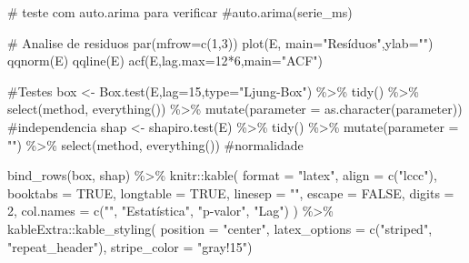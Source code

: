 \documentclass[
  letterpaper,
  DIV=11,
  numbers=noendperiod]{scrartcl}
\newenvironment{Shaded}{\begin{snugshade}}{\end{snugshade}}
\newcommand{\AttributeTok}[1]{\textcolor[rgb]{0.40,0.45,0.13}{#1}}
\newcommand{\CommentTok}[1]{\textcolor[rgb]{0.37,0.37,0.37}{#1}}
\newcommand{\ConstantTok}[1]{\textcolor[rgb]{0.56,0.35,0.01}{#1}}
\newcommand{\DecValTok}[1]{\textcolor[rgb]{0.68,0.00,0.00}{#1}}
\newcommand{\FunctionTok}[1]{\textcolor[rgb]{0.28,0.35,0.67}{#1}}
\newcommand{\NormalTok}[1]{\textcolor[rgb]{0.00,0.23,0.31}{#1}}
\newcommand{\OtherTok}[1]{\textcolor[rgb]{0.00,0.23,0.31}{#1}}
\newcommand{\SpecialCharTok}[1]{\textcolor[rgb]{0.37,0.37,0.37}{#1}}
\newcommand{\StringTok}[1]{\textcolor[rgb]{0.13,0.47,0.30}{#1}}
\begin{document}
\begin{Shaded}
\begin{Highlighting}[]
\CommentTok{\# teste com auto.arima para verificar}
\CommentTok{\#auto.arima(serie\_ms)}


\CommentTok{\# Analise de residuos}
\FunctionTok{par}\NormalTok{(}\AttributeTok{mfrow=}\FunctionTok{c}\NormalTok{(}\DecValTok{1}\NormalTok{,}\DecValTok{3}\NormalTok{))}
\FunctionTok{plot}\NormalTok{(E, }\AttributeTok{main=}\StringTok{"Resíduos"}\NormalTok{,}\AttributeTok{ylab=}\StringTok{""}\NormalTok{)}
\FunctionTok{qqnorm}\NormalTok{(E)}
\FunctionTok{qqline}\NormalTok{(E)}
\FunctionTok{acf}\NormalTok{(E,}\AttributeTok{lag.max=}\DecValTok{12}\SpecialCharTok{*}\DecValTok{6}\NormalTok{,}\AttributeTok{main=}\StringTok{"ACF"}\NormalTok{)}


\CommentTok{\#Testes}
\NormalTok{box }\OtherTok{\textless{}{-}} \FunctionTok{Box.test}\NormalTok{(E,}\AttributeTok{lag=}\DecValTok{15}\NormalTok{,}\AttributeTok{type=}\StringTok{"Ljung{-}Box"}\NormalTok{) }\SpecialCharTok{\%\textgreater{}\%} \FunctionTok{tidy}\NormalTok{() }\SpecialCharTok{\%\textgreater{}\%} \FunctionTok{select}\NormalTok{(method, }\FunctionTok{everything}\NormalTok{()) }\SpecialCharTok{\%\textgreater{}\%} \FunctionTok{mutate}\NormalTok{(}\AttributeTok{parameter =} \FunctionTok{as.character}\NormalTok{(parameter)) }\CommentTok{\#independencia}
\NormalTok{shap }\OtherTok{\textless{}{-}} \FunctionTok{shapiro.test}\NormalTok{(E) }\SpecialCharTok{\%\textgreater{}\%} \FunctionTok{tidy}\NormalTok{() }\SpecialCharTok{\%\textgreater{}\%} \FunctionTok{mutate}\NormalTok{(}\AttributeTok{parameter =} \StringTok{""}\NormalTok{) }\SpecialCharTok{\%\textgreater{}\%} \FunctionTok{select}\NormalTok{(method, }\FunctionTok{everything}\NormalTok{())  }\CommentTok{\#normalidade}

\FunctionTok{bind\_rows}\NormalTok{(box, shap) }\SpecialCharTok{\%\textgreater{}\%}
\NormalTok{  knitr}\SpecialCharTok{::}\FunctionTok{kable}\NormalTok{(}
    \AttributeTok{format =} \StringTok{"latex"}\NormalTok{,}
    \AttributeTok{align =} \FunctionTok{c}\NormalTok{(}\StringTok{"lccc"}\NormalTok{),}
    \AttributeTok{booktabs =} \ConstantTok{TRUE}\NormalTok{,}
    \AttributeTok{longtable =} \ConstantTok{TRUE}\NormalTok{,}
    \AttributeTok{linesep =} \StringTok{""}\NormalTok{,}
    \AttributeTok{escape =} \ConstantTok{FALSE}\NormalTok{,}
    \AttributeTok{digits =} \DecValTok{2}\NormalTok{,}
    \AttributeTok{col.names =} \FunctionTok{c}\NormalTok{(}\StringTok{""}\NormalTok{, }\StringTok{"Estatística"}\NormalTok{, }\StringTok{"p{-}valor"}\NormalTok{, }\StringTok{"Lag"}\NormalTok{)}
\NormalTok{    ) }\SpecialCharTok{\%\textgreater{}\%}
\NormalTok{  kableExtra}\SpecialCharTok{::}\FunctionTok{kable\_styling}\NormalTok{(}
      \AttributeTok{position =} \StringTok{"center"}\NormalTok{,}
      \AttributeTok{latex\_options =} \FunctionTok{c}\NormalTok{(}\StringTok{"striped"}\NormalTok{, }\StringTok{"repeat\_header"}\NormalTok{),}
      \AttributeTok{stripe\_color =} \StringTok{"gray!15"}\NormalTok{)}


\end{Highlighting}
\end{Shaded}
\end{document}
